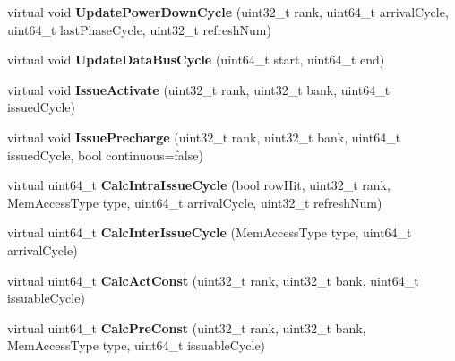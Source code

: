 \begin{DoxyCompactItemize}
\item 
\hypertarget{classMemChannelBase_ae68f7e5c032aa446b6aa02c17bacc522}{virtual void {\bfseries Update\-Power\-Down\-Cycle} (uint32\-\_\-t rank, uint64\-\_\-t arrival\-Cycle, uint64\-\_\-t last\-Phase\-Cycle, uint32\-\_\-t refresh\-Num)}\label{classMemChannelBase_ae68f7e5c032aa446b6aa02c17bacc522}

\item 
\hypertarget{classMemChannelBase_a73f22a26d591f85c406d83827292c4cd}{virtual void {\bfseries Update\-Data\-Bus\-Cycle} (uint64\-\_\-t start, uint64\-\_\-t end)}\label{classMemChannelBase_a73f22a26d591f85c406d83827292c4cd}

\item 
\hypertarget{classMemChannelBase_ab8b7871f04d6d878765970c633f10071}{virtual void {\bfseries Issue\-Activate} (uint32\-\_\-t rank, uint32\-\_\-t bank, uint64\-\_\-t issued\-Cycle)}\label{classMemChannelBase_ab8b7871f04d6d878765970c633f10071}

\item 
\hypertarget{classMemChannelBase_a9ca887aa9568fe8d719e83061b626836}{virtual void {\bfseries Issue\-Precharge} (uint32\-\_\-t rank, uint32\-\_\-t bank, uint64\-\_\-t issued\-Cycle, bool continuous=false)}\label{classMemChannelBase_a9ca887aa9568fe8d719e83061b626836}

\item 
\hypertarget{classMemChannelBase_aa3ce071e83717f6622fd131a22913828}{virtual uint64\-\_\-t {\bfseries Calc\-Intra\-Issue\-Cycle} (bool row\-Hit, uint32\-\_\-t rank, Mem\-Access\-Type type, uint64\-\_\-t arrival\-Cycle, uint32\-\_\-t refresh\-Num)}\label{classMemChannelBase_aa3ce071e83717f6622fd131a22913828}

\item 
\hypertarget{classMemChannelBase_a11279bae0e48fcc435ec25742f0afb61}{virtual uint64\-\_\-t {\bfseries Calc\-Inter\-Issue\-Cycle} (Mem\-Access\-Type type, uint64\-\_\-t arrival\-Cycle)}\label{classMemChannelBase_a11279bae0e48fcc435ec25742f0afb61}

\item 
\hypertarget{classMemChannelBase_a10806a1f527ae5593a1011e5c8edc941}{virtual uint64\-\_\-t {\bfseries Calc\-Act\-Const} (uint32\-\_\-t rank, uint32\-\_\-t bank, uint64\-\_\-t issuable\-Cycle)}\label{classMemChannelBase_a10806a1f527ae5593a1011e5c8edc941}

\item 
\hypertarget{classMemChannelBase_aeeb36af461d8a4be31261694c903367d}{virtual uint64\-\_\-t {\bfseries Calc\-Pre\-Const} (uint32\-\_\-t rank, uint32\-\_\-t bank, Mem\-Access\-Type type, uint64\-\_\-t issuable\-Cycle)}\label{classMemChannelBase_aeeb36af461d8a4be31261694c903367d}


\end{DoxyCompactItemize}
